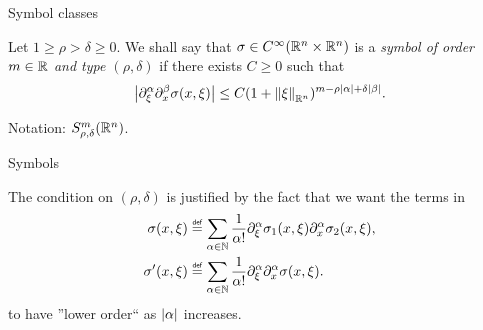 \documentclass{beamer}
\begin{document}
\begin{frame}
    {Symbol classes}

    \begin{definition}

        Let $1 \geq \rho > \delta \geq 0$.
        We shall say that $\sigma \in {C^\infty(\mathbb{R}^n \times \mathbb{R}^n)}$ is a \emph{symbol of order $m \in \mathbb{R}$ and type $(\rho, \delta)$}
        if there exists $C \geq 0$ such that
        \begin{align*}
            \abs {%
                \iD {\xi^\alpha}
                \iD {x^\beta}
                \sigma(x, \xi)
            } \leq
            C (1 + \norm [\R^n] \xi)^{m - \rho \abs \alpha + \delta \abs \beta}.
        \end{align*}

        \pause
        Notation: $S^{m}_{\rho, \delta}(\mathbb{R}^n)$.
    \end{definition}
\end{frame}

\begin{frame}
    {Symbols}

    The condition on $(\rho, \delta)$ is justified by the fact that we want the terms in
    \begin{align}
        \sigma(x, \xi)
        &\defeq
        \sum_{\alpha \in \N}
        \frac 1 {\alpha!}
        \iD {\xi^\alpha} \sigma_1(x, \xi)
        \iD {x^\alpha} \sigma_2(x, \xi),\\
        \sigma'(x, \xi)
        &\defeq
        \sum_{\alpha \in \N}
        \frac 1 {\alpha!}
        \iD {\xi^\alpha}
        \iD {x^\alpha} \sigma(x, \xi).
    \end{align}
    to have ''lower order`` as $\left|{\alpha}\right|$ increases.
\end{frame}
\end{document}
